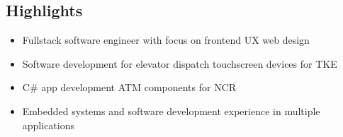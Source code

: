 \documentclass[]{cv}
\begin{document}
\begin{body}
	\section{\vspace{0.1cm} Highlights}
	\begin{itemize}
		\item {Fullstack software engineer with focus on frontend UX web design}
		\item {Software development for elevator dispatch touchscreen devices for TKE}
		\item {C\# app development ATM components for NCR}
		\item {Embedded systems and software development experience in multiple applications}
		      \vspace{0.1cm}
	\end{itemize}

\end{body}
\end{document}
